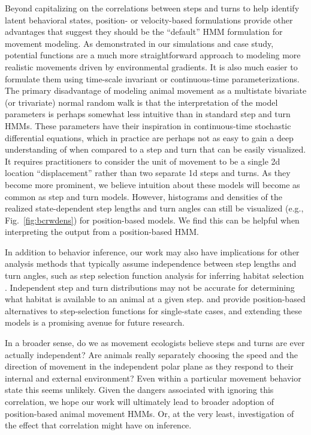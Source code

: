 \documentclass[12pt]{article}\usepackage[]{graphicx}\usepackage[]{xcolor}
\begin{document}
Beyond capitalizing on the correlations between steps and turns to help identify latent behavioral states, position- or velocity-based formulations provide other advantages that suggest they should be the ``default'' HMM formulation for movement modeling. As demonstrated in our simulations and case study, potential functions are a much more straightforward approach to modeling more realistic movements driven by environmental gradients. It is also much easier to formulate them using time-scale invariant or continuous-time parameterizations. The primary disadvantage of modeling animal movement as a multistate bivariate (or trivariate) normal random walk is that the interpretation of the model parameters is perhaps somewhat less intuitive than in standard step and turn HMMs. These parameters have their inspiration in continuous-time stochastic differential equations, which in practice are perhaps not as easy to gain a deep understanding of when compared to a step and turn that can be easily visualized. It requires practitioners to consider the unit of movement to be a single 2d location ``displacement'' rather than two separate 1d steps and turns. As they become more prominent, we believe intuition about these models will become as common as step and turn models. However, histograms and densities of the realized state-dependent step lengths and turn angles can still be visualized (e.g., Fig.\ \ref{fig:bcrwdens}) for position-based models. We find this can be helpful when interpreting the output from a position-based HMM. 

In addition to behavior inference, our work may also have implications for other analysis methods that typically assume independence between step lengths and turn angles, such as step selection function analysis for inferring habitat selection \citep[e.g.][]{thurfjell2014applications}. Independent step and turn distributions may not be accurate for determining what habitat is available to an animal at a given step. \citet{Johnson:2008kx} and \citet{Christ:2008fk} provide position-based alternatives to step-selection functions for single-state cases, and extending these models is a promising avenue for future research.

In a broader sense, do we as movement ecologists believe steps and turns are ever actually independent? Are animals really separately choosing the speed and the direction of movement in the independent polar plane as they respond to their internal and external environment? Even within a particular movement behavior state this seems unlikely. Given the dangers associated with ignoring this correlation, we hope our work will ultimately lead to broader adoption of position-based animal movement HMMs. Or, at the very least, investigation of the effect that correlation might have on inference. 



\end{document}
